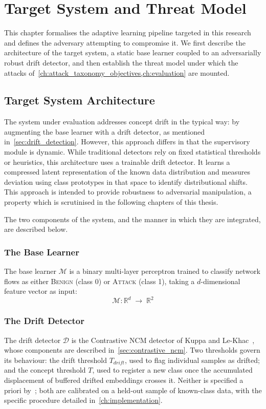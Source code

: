 \chapter{Target System and Threat Model}
\label{ch:target_system_threat_model}

This chapter formalises the adaptive learning pipeline targeted in this research and defines the adversary attempting to compromise it. We first describe the architecture of the target system, a static base learner coupled to an adversarially robust drift detector, and then establish the threat model under which the attacks of~\cref{ch:attack_taxonomy_objectives,ch:evaluation} are mounted.

\section{Target System Architecture}
The system under evaluation addresses concept drift in the typical way: by augmenting the base learner with a drift detector, as mentioned in~\cref{sec:drift_detection}. However, this approach differs in that the supervisory module is dynamic. While traditional detectors rely on fixed statistical thresholds or heuristics, this architecture uses a trainable drift detector. It learns a compressed latent representation of the known data distribution and measures deviation using class prototypes in that space to identify distributional shifts. This approach is intended to provide robustness to adversarial manipulation, a property which is scrutinised in the following chapters of this thesis.

The two components of the system, and the manner in which they are integrated, are described below.

\subsection{The Base Learner}
The base learner $\mathcal{M}$ is a binary multi-layer perceptron trained to classify network flows as either \textsc{Benign} (class 0) or \textsc{Attack} (class 1), taking a $d$-dimensional feature vector as input:
\[
  \mathcal{M}: \mathbb{R}^{d} \;\to\; \mathbb{R}^{2}
\]

\subsection{The Drift Detector}
The drift detector $\mathcal{D}$ is the Contrastive NCM detector of Kuppa and Le-Khac~\cite{Kuppa_2022}, whose components are described in~\cref{sec:contrastive_ncm}. Two thresholds govern its behaviour: the drift threshold $T_{drift}$, used to flag individual samples as drifted; and the concept threshold $T$, used to register a new class once the accumulated displacement of buffered drifted embeddings crosses it. Neither is specified a priori by~\cite{Kuppa_2022}; both are calibrated on a held-out sample of known-class data, with the specific procedure detailed in~\cref{ch:implementation}.

